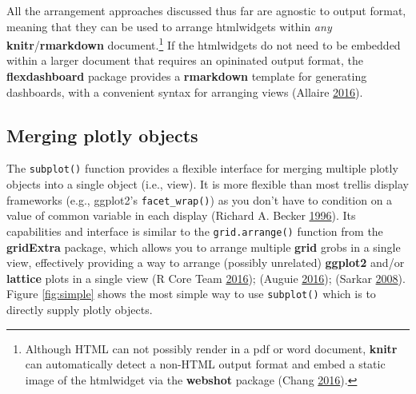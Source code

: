 \documentclass[12pt,]{isuthesis}
\newenvironment{Shaded}{\begin{snugshade}}{\end{snugshade}}
\newcommand{\KeywordTok}[1]{\textcolor[rgb]{0.13,0.29,0.53}{\textbf{{#1}}}}
\newcommand{\DataTypeTok}[1]{\textcolor[rgb]{0.13,0.29,0.53}{{#1}}}
\newcommand{\StringTok}[1]{\textcolor[rgb]{0.31,0.60,0.02}{{#1}}}
\newcommand{\NormalTok}[1]{{#1}}
\let\rmarkdownfootnote\footnote%
\def\footnote{\protect\rmarkdownfootnote}
\begin{document}
All the arrangement approaches discussed thus far are agnostic to output
format, meaning that they can be used to arrange htmlwidgets within
\emph{any} \textbf{knitr}/\textbf{rmarkdown} document.\footnote{Although
  HTML can not possibly render in a pdf or word document, \textbf{knitr}
  can automatically detect a non-HTML output format and embed a static
  image of the htmlwidget via the \textbf{webshot} package (Chang
  \protect\hyperlink{ref-webshot}{2016}).} If the htmlwidgets do not
need to be embedded within a larger document that requires an opininated
output format, the \textbf{flexdashboard} package provides a
\textbf{rmarkdown} template for generating dashboards, with a convenient
syntax for arranging views (Allaire
\protect\hyperlink{ref-flexdashboard}{2016}).

\subsection{Merging plotly objects}\label{merging-plotly-objects}

The \texttt{subplot()} function provides a flexible interface for
merging multiple plotly objects into a single object (i.e., view). It is
more flexible than most trellis display frameworks (e.g., ggplot2's
\texttt{facet\_wrap()}) as you don't have to condition on a value of
common variable in each display (Richard A. Becker
\protect\hyperlink{ref-trellis}{1996}). Its capabilities and interface
is similar to the \texttt{grid.arrange()} function from the
\textbf{gridExtra} package, which allows you to arrange multiple
\textbf{grid} grobs in a single view, effectively providing a way to
arrange (possibly unrelated) \textbf{ggplot2} and/or \textbf{lattice}
plots in a single view (R Core Team \protect\hyperlink{ref-base}{2016});
(Auguie \protect\hyperlink{ref-gridExtra}{2016}); (Sarkar
\protect\hyperlink{ref-lattice}{2008}). Figure \ref{fig:simple} shows
the most simple way to use \texttt{subplot()} which is to directly
supply plotly objects.

\begin{Shaded}
\end{Shaded}
\end{document}
